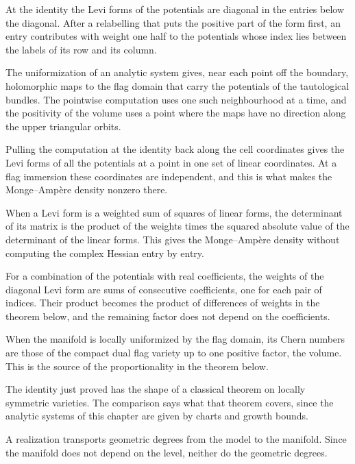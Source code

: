 At the identity the Levi forms of the potentials are diagonal in the entries below the diagonal.
After a relabelling that puts the positive part of the form first, an entry contributes with weight
one half to the potentials whose index lies between the labels of its row and its column.

The uniformization of an analytic system gives, near each point off the boundary, holomorphic maps
to the flag domain that carry the potentials of the tautological bundles. The pointwise computation
uses one such neighbourhood at a time, and the positivity of the volume uses a point where the maps
have no direction along the upper triangular orbits.

Pulling the computation at the identity back along the cell coordinates gives the Levi forms of all
the potentials at a point in one set of linear coordinates. At a flag immersion these coordinates
are independent, and this is what makes the Monge--Amp\`ere density nonzero there.

When a Levi form is a weighted sum of squares of linear forms, the determinant of its matrix is the
product of the weights times the squared absolute value of the determinant of the linear forms. This
gives the Monge--Amp\`ere density without computing the complex Hessian entry by entry.

For a combination of the potentials with real coefficients, the weights of the diagonal Levi form
are sums of consecutive coefficients, one for each pair of indices. Their product becomes the
product of differences of weights in the theorem below, and the remaining factor does not depend on
the coefficients.

When the manifold is locally uniformized by the flag domain, its Chern numbers are those of the
compact dual flag variety up to one positive factor, the volume. This is the source of the
proportionality in the theorem below.

The identity just proved has the shape of a classical theorem on locally symmetric varieties. The
comparison says what that theorem covers, since the analytic systems of this chapter are given by
charts and growth bounds.

A realization transports geometric degrees from the model to the manifold. Since the manifold does
not depend on the level, neither do the geometric degrees.

